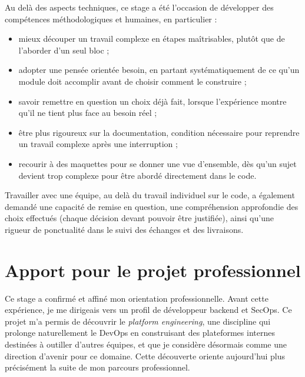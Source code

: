 Au delà des aspects techniques, ce stage a été l'occasion de développer
des compétences méthodologiques et humaines, en particulier :

\begin{itemize}
  \item mieux découper un travail complexe en étapes maîtrisables,
        plutôt que de l'aborder d'un seul bloc ;
  \item adopter une pensée orientée besoin, en partant systématiquement
        de ce qu'un module doit accomplir avant de choisir comment le
        construire ;
  \item savoir remettre en question un choix déjà fait, lorsque
        l'expérience montre qu'il ne tient plus face au besoin réel ;
  \item être plus rigoureux sur la documentation, condition nécessaire
        pour reprendre un travail complexe après une interruption ;
  \item recourir à des maquettes pour se donner une vue d'ensemble,
        dès qu'un sujet devient trop complexe pour être abordé
        directement dans le code.
\end{itemize}

Travailler avec une équipe, au delà du travail individuel sur le code,
a également demandé une capacité de remise en question, une
compréhension approfondie des choix effectués (chaque décision devant
pouvoir être justifiée), ainsi qu'une rigueur de ponctualité dans le
suivi des échanges et des livraisons.

\section*{Apport pour le projet professionnel}

Ce stage a confirmé et affiné mon orientation professionnelle. Avant
cette expérience, je me dirigeais vers un profil de développeur backend
et SecOps. Ce projet m'a permis de découvrir le \textit{platform
engineering}, une discipline qui prolonge naturellement le DevOps en
construisant des plateformes internes destinées à outiller d'autres
équipes, et que je considère désormais comme une direction d'avenir pour
ce domaine. Cette découverte oriente aujourd'hui plus précisément la
suite de mon parcours professionnel.